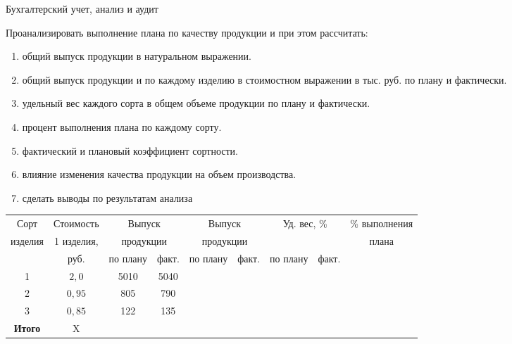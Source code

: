 \documentclass[
	11pt,
	a4paper,
	]
	{article}
\begin{document}
\begin{center}\lowGE * \end{center}
\newpage





 {Бухгалтерский учет, анализ и аудит}
\prGE

	Проанализировать выполнение плана по качеству продукции и при этом рассчитать: 

	\begin{enumerate}
		\item общий выпуск продукции в натуральном выражении.
		\item общий выпуск продукции и по каждому изделию в стоимостном выражении в тыс. руб. по плану и фактически.
		\item удельный вес каждого сорта в общем объеме продукции по плану и фактически.
		\item процент выполнения плана по каждому сорту.
		\item фактический и плановый коэффициент сортности.
		\item влияние изменения качества продукции на объем производства.
		\item сделать выводы по результатам анализа
	\end{enumerate}

\begin{table}[ht!]\centering
\begin{tabular}{|c |c |c|c |c|c |c|c |c|} 
\hline
Сорт & 
Стоимость & 
\multicolumn{2}{c|}{Выпуск} & 
\multicolumn{2}{c|}{Выпуск} &
\multicolumn{2}{c|}{Уд. вес, \%} & 
\% выполнения 
\\ 
изделия & 
1 изделия, & 
\multicolumn{2}{c|}{продукции} & 
\multicolumn{2}{c|}{продукции} &
\multicolumn{2}{c|}{} & плана 
\\ \cline{3-8}
& руб. & по плану & факт. & по плану & факт. & по плану & факт. & 
\\ \hline
1 & $2{,}0$ & 5010 & 5040 & & & & & 
\\ \hline
2 & $0{,}95$ & 805 & 790 & & & & &
\\ \hline
3 & $0{,}85$ & 122 & 135 & & & & & 
\\ \hline
\textbf{Итого} & X & & & & & & & 
\\ \hline
\end{tabular}
\end{table}

\begin{center}\lowGE * \end{center}
\newpage
\end{document}
